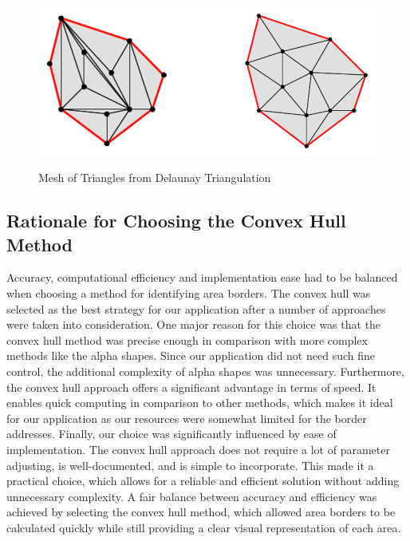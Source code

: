     \begin{figure} [H]
        \centering
        \includegraphics [width=.75\textwidth] {images/andreas/areaBorders/dtPic.png}
        \caption{Mesh of Triangles from Delaunay Triangulation}
        \cite{Andi:dtPic}
    \end{figure}

    \subsection{Rationale for Choosing the Convex Hull Method}
    Accuracy, computational efficiency and implementation ease had to be balanced when choosing a method for identifying area borders. The convex hull was selected as the best strategy for our application after a number of approaches were taken into consideration. \newline
    One major reason for this choice was that the convex hull method was precise enough in comparison with more complex methods like the alpha shapes. Since our application did not need such fine control, the additional complexity of alpha shapes was unnecessary. \newline
    Furthermore, the convex hull approach offers a significant advantage in terms of speed. It enables quick computing in comparison to other methods, which makes it ideal for our application as our resources were somewhat limited for the border addresses. \newline
    Finally, our choice was significantly influenced by ease of implementation. The convex hull approach does not require a lot of parameter adjusting, is well-documented, and is simple to incorporate. This made it a practical choice, which allows for a reliable and efficient solution without adding unnecessary complexity. \newline
    A fair balance between accuracy and efficiency was achieved by selecting the convex hull method, which allowed area borders to be calculated quickly while still providing a clear visual representation of each area.

